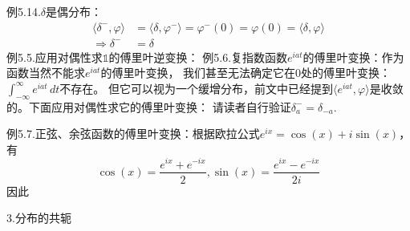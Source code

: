 \documentclass{ctexbook}
\begin{document}
例5.14.$\delta$是偶分布：
\begin{align*}
    \langle \delta^-,\varphi\rangle & =\langle \delta,\varphi^-\rangle=\varphi^-(0)=\varphi(0)=\langle \delta,\varphi\rangle \\
    \Rightarrow \delta^-            & =\delta
\end{align*}
例5.5.应用对偶性求$\mathds{1}$的傅里叶逆变换：
\noindent 例5.6.复指数函数$e^{iat}$的傅里叶变换：作为函数当然不能求$e^{iat}$的傅里叶变换，
我们甚至无法确定它在0处的傅里叶变换：$\int_{-\infty}^{\infty}e^{iat}\,dt$不存在。
但它可以视为一个缓增分布，前文中已经提到$\langle e^{iat},\varphi\rangle$是收敛
的。下面应用对偶性求它的傅里叶变换：
请读者自行验证$\delta_{a}^-= \delta_{-a}$.

\noindent 例5.7.正弦、余弦函数的傅里叶变换：根据欧拉公式$e^{ix}=\cos(x)+i\sin(x)$，
有\[\cos(x)=\frac{e^{ix}+e^{-ix}}{2},\sin(x)=\frac{e^{ix}-e^{-ix}}{2i}\]因此

\noindent 3.分布的共轭
\end{document}
